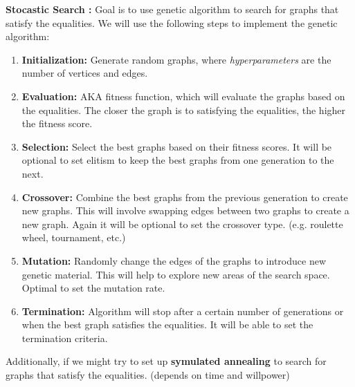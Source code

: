 \documentclass[12pt]{article}
\begin{document}
\textbf{Stocastic Search :} Goal is to use genetic algorithm to search for graphs that satisfy the equalities. We will use the following steps to implement the genetic algorithm:
\begin{enumerate}
  \item \textbf{Initialization:} Generate random graphs, where \textit{hyperparameters} are the number of vertices and edges.
  \item \textbf{Evaluation:} AKA fitness function, which will evaluate the graphs based on the equalities. The closer the graph is to satisfying the equalities, the higher the fitness score.
  \item \textbf{Selection:} Select the best graphs based on their fitness scores. It will be optional to set elitism to keep the best graphs from one generation to the next.
  \item \textbf{Crossover:} Combine the best graphs from the previous generation to create new graphs. This will involve swapping edges between two graphs to create a new graph. Again it will be optional to set the crossover type. (e.g. roulette wheel, tournament, etc.)
  \item \textbf{Mutation:} Randomly change the edges of the graphs to introduce new genetic material. This will help to explore new areas of the search space. Optimal to set the mutation rate.
  \item \textbf{Termination:} Algorithm will stop after a certain number of generations or when the best graph satisfies the equalities. It will be able to set the termination criteria.

\end{enumerate}

Additionally, if we might try to set up \textbf{symulated annealing} to search for graphs that satisfy the equalities. (depends on time and willpower)
\end{document}
